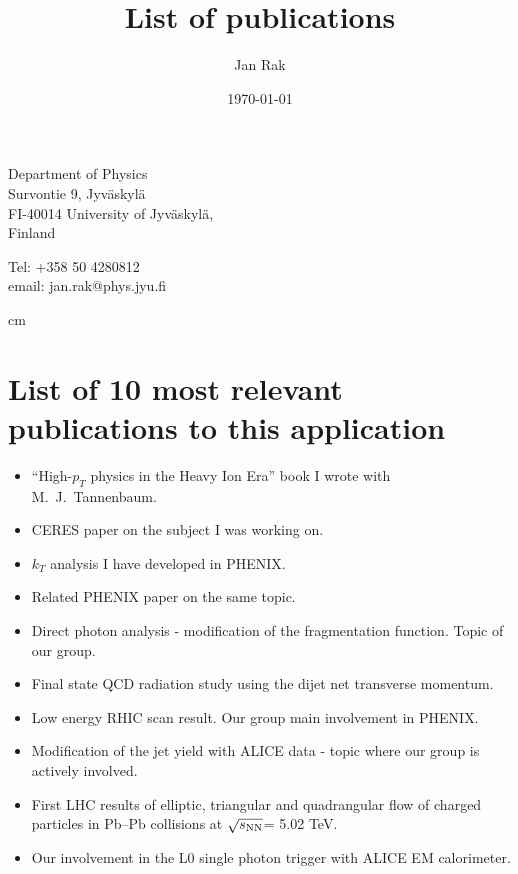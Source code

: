 \documentclass[12pt]{article}
\title{List of publications}
\date{\today}
\author{Jan Rak}
\begin{document}
\maketitle

\parbox{7cm}{
Department of Physics \\
Survontie 9, Jyv\"askyl\"a\\
FI-40014 University of Jyv\"askyl\"a,\\ 
Finland}
\hfill
\parbox{5cm}{
Tel: +358 50 4280812\\
email: jan.rak@phys.jyu.fi\\
}

 cm

\section{List of 10 most relevant publications to this application}
\begin{itemize}
\item \cite{JanRak2013} ``High-$p_{T}$ physics in the Heavy Ion Era'' book I wrote with M.~J.~Tannenbaum.
\item \cite{Agakichiev:2003gg} CERES paper on the subject I was working on.
\item \cite{Adler:2006sc} $k_{T}$ analysis I have developed in PHENIX.
\item \cite{Adler:2005ad} Related PHENIX paper on the same topic. %
\item \cite{Adare:2010yw} Direct photon analysis - modification of the fragmentation function. Topic of our group. %
\item \cite{Adam:2015xea} Final state QCD radiation study using the dijet net transverse momentum.
\item \cite{Adare:2012uk}  Low energy RHIC scan result. Our group main involvement in PHENIX. %
\item \cite{Aamodt:2011vg} Modification of the jet yield with ALICE data - topic where our group is actively involved. %
\item \cite{Adam:2016izf} First LHC results of elliptic, triangular and quadrangular flow of charged particles in Pb--Pb collisions at $\sqrt{s_{\rm NN}}$= 5.02 TeV.

\item \cite{Kral:2012ae} Our involvement in the L0 single photon trigger with ALICE EM calorimeter.
\end{itemize}
\end{document}
